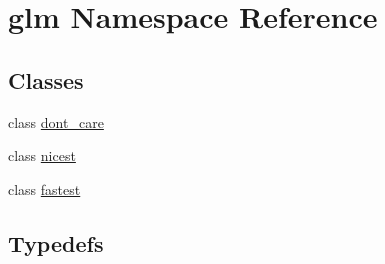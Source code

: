 \hypertarget{namespaceglm}{\section{glm Namespace Reference}
\label{namespaceglm}
}
\subsection*{Classes}
\begin{DoxyCompactItemize}
\item 
class \hyperlink{classglm_1_1dont__care}{dont\-\_\-care}
\item 
class \hyperlink{classglm_1_1nicest}{nicest}
\item 
class \hyperlink{classglm_1_1fastest}{fastest}
\end{DoxyCompactItemize}
\subsection*{Typedefs}
